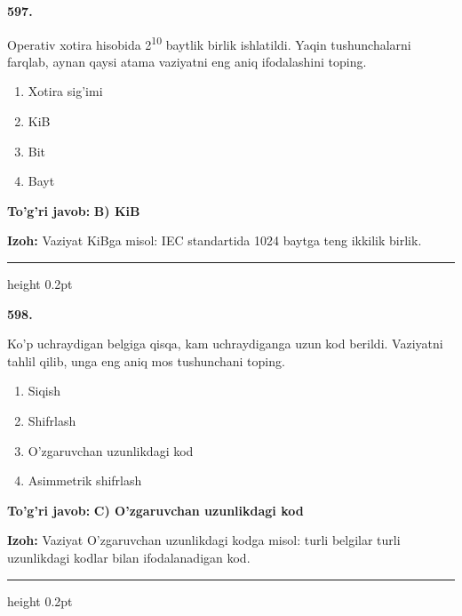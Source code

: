 \documentclass[10pt,a4paper,oneside]{article}
\begin{document}
\noindent\textbf{\color{ink}597.}
\par
Operativ xotira hisobida 2\textsuperscript{1}\textsuperscript{0} baytlik birlik ishlatildi. Yaqin tushunchalarni farqlab, aynan qaysi atama vaziyatni eng aniq ifodalashini toping.
\begin{enumerate}[label=\Alph*),leftmargin=9mm]
\item Xotira sig'imi
\item KiB
\item Bit
\item Bayt
\end{enumerate}
\begin{tcolorbox}[enhanced,breakable,colback=teal!4,colframe=teal!50!black,boxrule=0.5pt,arc=1.1mm,left=3mm,right=3mm,top=1.7mm,bottom=1.7mm,before skip=2mm,after skip=2mm]
\textbf{\color{teal}To'g'ri javob:} \textbf{B) KiB}
\par\smallskip
\textbf{Izoh:} Vaziyat KiBga misol: IEC standartida 1024 baytga teng ikkilik birlik.
\end{tcolorbox}
\vspace{2mm}\hrule height 0.2pt \vspace{3mm}

\noindent\textbf{\color{ink}598.}
\par
Ko'p uchraydigan belgiga qisqa, kam uchraydiganga uzun kod berildi. Vaziyatni tahlil qilib, unga eng aniq mos tushunchani toping.
\begin{enumerate}[label=\Alph*),leftmargin=9mm]
\item Siqish
\item Shifrlash
\item O'zgaruvchan uzunlikdagi kod
\item Asimmetrik shifrlash
\end{enumerate}
\begin{tcolorbox}[enhanced,breakable,colback=teal!4,colframe=teal!50!black,boxrule=0.5pt,arc=1.1mm,left=3mm,right=3mm,top=1.7mm,bottom=1.7mm,before skip=2mm,after skip=2mm]
\textbf{\color{teal}To'g'ri javob:} \textbf{C) O'zgaruvchan uzunlikdagi kod}
\par\smallskip
\textbf{Izoh:} Vaziyat O'zgaruvchan uzunlikdagi kodga misol: turli belgilar turli uzunlikdagi kodlar bilan ifodalanadigan kod.
\end{tcolorbox}
\vspace{2mm}\hrule height 0.2pt \vspace{3mm}
\end{document}
